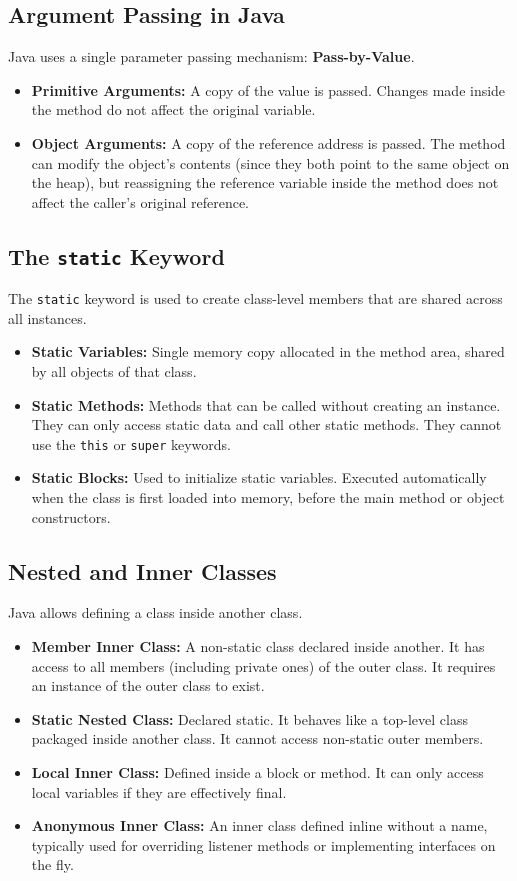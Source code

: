 \documentclass[12pt,a4paper]{article}
\begin{document}
\subsection{Argument Passing in Java}
Java uses a single parameter passing mechanism: \textbf{Pass-by-Value}.
\begin{itemize}[leftmargin=*, itemsep=3.5pt]
  \item \textbf{Primitive Arguments:} A copy of the value is passed. Changes made inside the method do not affect the original variable.
  \item \textbf{Object Arguments:} A copy of the reference address is passed. The method can modify the object's contents (since they both point to the same object on the heap), but reassigning the reference variable inside the method does not affect the caller's original reference.
\end{itemize}

\subsection{The \texttt{static} Keyword}
The \texttt{static} keyword is used to create class-level members that are shared across all instances.
\begin{itemize}[leftmargin=*, itemsep=4pt]
  \item \textbf{Static Variables:} Single memory copy allocated in the method area, shared by all objects of that class.
  \item \textbf{Static Methods:} Methods that can be called without creating an instance. They can only access static data and call other static methods. They cannot use the \texttt{this} or \texttt{super} keywords.
  \item \textbf{Static Blocks:} Used to initialize static variables. Executed automatically when the class is first loaded into memory, before the main method or object constructors.
\end{itemize}

\subsection{Nested and Inner Classes}
Java allows defining a class inside another class.
\begin{itemize}[leftmargin=*, itemsep=4pt]
  \item \textbf{Member Inner Class:} A non-static class declared inside another. It has access to all members (including private ones) of the outer class. It requires an instance of the outer class to exist.
  \item \textbf{Static Nested Class:} Declared static. It behaves like a top-level class packaged inside another class. It cannot access non-static outer members.
  \item \textbf{Local Inner Class:} Defined inside a block or method. It can only access local variables if they are effectively final.
  \item \textbf{Anonymous Inner Class:} An inner class defined inline without a name, typically used for overriding listener methods or implementing interfaces on the fly.
\end{itemize}
\end{document}
